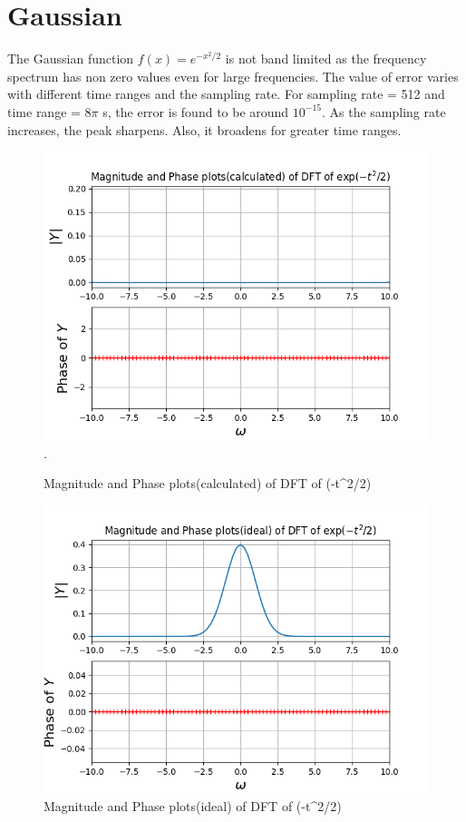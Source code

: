 \documentclass[11pt, a4paper]{article}
\begin{document}
   
\newpage
\section{Gaussian}
The Gaussian function $f(x) = e^{-x^2/2}$ is not band limited as the frequency spectrum has non zero values even for large frequencies.
The value of error varies with different time ranges and the sampling rate. For sampling rate = 512 and time range = $8\pi$ s, the error is found to be around $10^{-15}$.
As the sampling rate increases, the peak sharpens. Also, it broadens for greater time ranges.
\begin{figure}[!tbh]
   	\centering
   	\includegraphics[scale=0.5]{figure3.png}. 
   	\caption{Magnitude and Phase plots(calculated) of DFT of  \exp(-t^{2}/2)}
   	\label{fig:sample}
   \end{figure} 


\begin{figure}[!tbh]
   	\centering
   	\includegraphics[scale=0.5]{figure4.png}  
   	\caption{Magnitude and Phase plots(ideal) of DFT of  \exp(-t^{2}/2)}
   	\label{fig:sample}
   \end{figure}
   
\end{document}

